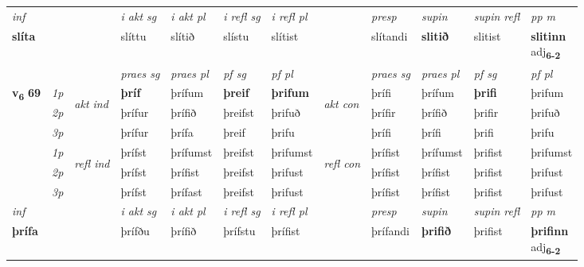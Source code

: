\begin{longtable}[l]{X>{\footnotesize\itshape}llXXXXlXXXX}
   {\textit{inf}} & &  & \textit{i akt sg} & \textit{i akt pl} & \textit{i refl sg} & \textit{i refl pl} && \textit{presp} & \textit{supin} & \textit{supin refl} & \textit{pp m} \\*
  {\textbf{slíta}} & && slíttu  & slítið & slístu & slítist && slítandi &  \textbf{slitið} & slitist & \specialcell{\textbf{slitinn} \\ adj\textbf{\textsubscript{6-2}}} \\*

\midrule

 & &   & \textit{praes sg}  & \textit{praes pl}    & \textit{ pf sg} & \textit{pf pl} & & \textit{praes sg}  & \textit{praes pl}    & \textit{pf sg} & \textit{pf pl }  \\ \cmidrule{4-7} \cmidrule{9-12}
 \multirow{2}{*}{{{\textbf{v{\textsubscript{6}}} \Large{\textbf{69}}}}}  & 1p & \multirow{3}{*}{\begin{turn}{90}\textit{akt ind}\end{turn}} & \textbf{þríf} & þrífum & \textbf{þreif} & \textbf{þrifum} & \multirow{3}{*}{\begin{turn}{90}\textit{akt con}\end{turn}} &þrífi & þrífum & \textbf{þrifi} & þrifum\\*
 & 2p &  &  þrífur  & þrífið & þreifst & þrifuð & & þrífir & þrífið & þrifir & þrifuð \\*
 & 3p &  & þrífur & þrífa & þreif & þrifu & & þrífi & þrífi& þrifi & þrifu \\*
\cmidrule{4-7} \cmidrule{9-12}
 & 1p & \multirow{3}{*}{\begin{turn}{90}\textit{refl ind}\end{turn}}  & þrífst & þrífumst & þreifst & þrifumst & \multirow{3}{*}{\begin{turn}{90}\textit{refl con}\end{turn}}  &þrífist & þrífumst & þrifist & þrifumst \\*
 & 2p &  & þrífst & þrífist & þreifst & þrifust & &þrífist & þrífist & þrifist & þrifust \\*
 & 3p  & & þrífst & þrífast & þreifst & þrifust & & þrífist & þrífist& þrifist & þrifust \\*
\cmidrule{4-7} \cmidrule{9-12}

   {\textit{inf}} & &  & \textit{i akt sg} & \textit{i akt pl} & \textit{i refl sg} & \textit{i refl pl} && \textit{presp} & \textit{supin} & \textit{supin refl} & \textit{pp m} \\*
  {\textbf{þrífa}} & && þrífðu  & þrífið & þrífstu & þrífist && þrífandi &  \textbf{þrifið} & þrifist & \specialcell{\textbf{þrifinn} \\ adj\textbf{\textsubscript{6-2}}} \\*


\end{longtable}
